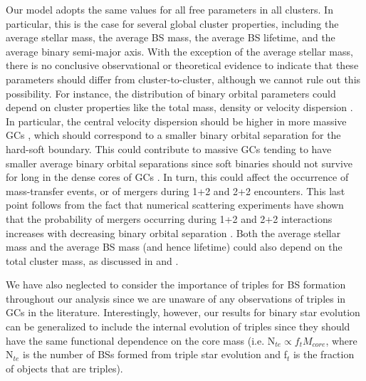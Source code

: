 Our model adopts the same values for all free parameters in all
clusters.  In particular, this is the case for several global cluster
properties, including the average stellar mass, the average BS 
mass, the average BS lifetime, and the average 
binary semi-major axis.  With the exception of the average stellar
mass, there is no conclusive observational or theoretical
evidence to indicate that these parameters should differ from
cluster-to-cluster, although we cannot rule out this possibility.  
For instance, the distribution of binary orbital parameters could
depend on cluster properties 
like the total mass, density or velocity dispersion
\citep[e.g.][]{sigurdsson93}.  In particular, the central velocity
dispersion should be higher in more massive GCs
\citep[e.g.][]{djorgovski94}, which should correspond to a smaller
binary orbital separation for the hard-soft boundary.  
This could contribute to massive GCs tending to have smaller average
binary orbital separations since soft binaries should not survive
for long in the dense cores of GCs \citep[e.g.][]{heggie03}.  In turn,
this could 
affect the occurrence of mass-transfer events, or of 
mergers during 1+2 and 2+2 encounters.  This last point follows from
the fact that numerical scattering experiments have shown that the 
probability of mergers occurring during 1+2 and 2+2 interactions
increases with decreasing binary orbital separation
\citep[e.g.][]{fregeau04}.  Both the average stellar mass and the
average BS mass (and hence lifetime) could also depend on the total 
cluster mass, as discussed in \citet{leigh09} and \citet{leigh11a}.

We have also neglected to consider the importance of triples for BS
formation throughout our analysis \citep[e.g.][]{perets09} since we
are unaware of any 
observations of triples in GCs in the literature.  Interestingly,
however, our results for binary star evolution can be generalized to
include the internal evolution of triples since they should have the
same functional dependence on the core mass (i.e. N$_{te} \propto
f_tM_{core}$, where N$_{te}$ is the number of BSs formed from triple
star evolution and f$_{t}$ is the fraction of objects that are
triples). 

